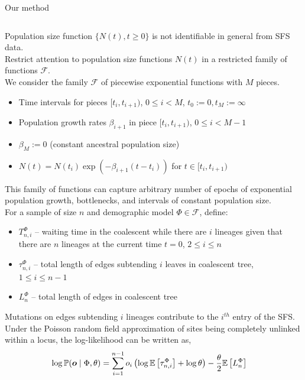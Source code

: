 \documentclass[final,hyperref={pdfpagelabels=false},professionalfonts,mathserif]{beamer}
\def\bbE{\mathbb{E}}
\def\bbP{\mathbb{P}}
\def\bfmath#1{\mathchoice
        {\mbox{\boldmath$#1$}}%
        {\mbox{\boldmath$#1$}}%
        {\mbox{\boldmath$\scriptstyle#1$}}%
        {\mbox{\boldmath$\scriptscriptstyle#1$}}}%
\def\bfo{\bfmath{o}}
\def\cF{\mathcal{F}}
\begin{document}
\begin{frame}[fragile]
\begin{columns}[t]
\begin{column}{.495\linewidth}
        \begin{block}{\large Our method} \justifying
	        \begin{columns}[T] 
            \begin{column}{.97\linewidth}
	   		    \vspace{-0.5cm}
				Population size function $\{ N(t), t \geq 0 \}$ is not identifiable in general from SFS data. \\
				Restrict attention to population size functions $N(t)$ in a restricted family of functions $\cF$. \\
				We consider the family $\cF$ of piecewise exponential functions with $M$ pieces.
				\begin{itemize}
					\item Time intervals for pieces $[t_i, t_{i+1})$, $0 \leq i < M$, $t_0 := 0, t_M := \infty$
					\item Population growth rates $\beta_{i+1}$ in piece $[t_i, t_{i+1})$, $0 \leq i < M - 1$
					\item $\beta_M := 0$ (constant ancestral population size)
					\item $N(t) = N(t_i) \exp(- \beta_{i+1} (t - t_i))$ for $t \in [t_i, t_{i+1})$
				\end{itemize}
				This family of functions can capture arbitrary number of epochs of exponential population growth, bottlenecks, and intervals of constant population size. \\
			    For a sample of size $n$ and demographic model $\Phi \in \cF$, define:
			    \begin{itemize}
					\item $T^{\Phi}_{n,i}$ -- waiting time in the coalescent while there are $i$ lineages given that there are $n$ lineages at the current time $t = 0$, $2 \leq i \leq n$
			        \item $\tau^{\Phi}_{n,i}$ -- total length of edges subtending $i$ leaves in coalescent tree, $1 \leq i \leq n-1$
			        \item $L^{\Phi}_n$ -- total length of edges in coalescent tree
			    \end{itemize}
				Mutations on edges subtending $i$ lineages contribute to the $i^{th}$ entry of the SFS.\\
				Under the Poisson random field approximation of sites being completely unlinked within a locus, the log-likelihood can be written as,
				\begin{align*}
					\log \bbP(\bfo \mid \Phi, \theta) &= \sum_{i=1}^{n-1} o_i \left(\log \bbE\left[\tau^{\Phi}_{n,i}\right] + \log\theta \right) - \frac{\theta}{2} \bbE\left[L^{\Phi}_{n}\right]

\end{align*}
\end{column}
\end{columns}
\end{block}
\end{column}
\end{columns}
\end{frame}
\end{document}
